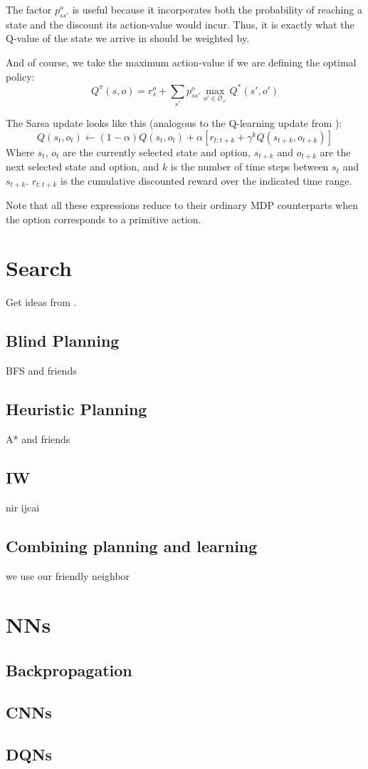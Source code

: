 The factor $p^o_{ss'}$ is useful because it incorporates both the probability of
reaching a state and the discount its action-value would incur. Thus, it is
exactly what the Q-value of the state we arrive in should be weighted by.

And of course, we take the maximum action-value if we are defining the optimal policy:
\begin{equation}
  Q^\pi(s, o) = r^o_s + \sum_{s'}p^o_{ss'} \max_{o' \in \mathcal{O}_{s'}} Q^*(s', o')
\end{equation}

The Sarsa update looks like this (analogous to the Q-learning update from
\cite[Section~3.2]{sutton1999between}):
\begin{equation}
  Q(s_t, o_t) \gets (1-\alpha)Q(s_t, o_t) + \alpha \left[r_{t:t+k} + \gamma^k Q(s_{t+k}, o_{t+k}) \right]
\end{equation}
Where $s_t$, $o_t$ are the currently selected state and option, $s_{t+k}$ and
$o_{t+k}$ are the next selected state and option, and $k$ is the number of time
steps between $s_t$ and $s_{t+k}$. $r_{t:t+k}$ is the cumulative discounted
reward over the indicated time range.

Note that all these expressions reduce to their ordinary \ac{MDP} counterparts
when the option corresponds to a primitive action.

\section{Search}

Get ideas from \cite{russell2009aima}.
\subsection{Blind Planning}
BFS and friends
\subsection{Heuristic Planning}
A* and friends
\subsection{\acl{IW}}
nir ijcai
\subsection{Combining planning and learning}
we use our friendly neighbor \cite{sutton1998introduction}


\section{\aclp{NN}}
\subsection{Backpropagation}
\subsection{\aclp{CNN}}
\subsection{\aclp{DQN}\label{subsection:dqn}}

